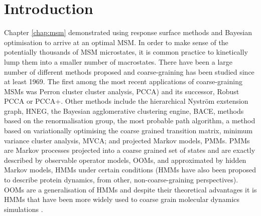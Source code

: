 \section{Introduction}
Chapter \ref{chap:msm} demonstrated using response surface methods and Bayesian optimisation to arrive at an optimal MSM. In order to make sense of the potentially thousands of MSM microstates, it is common practice to kinetically lump them into a smaller number of macrostates. There have been a large number of different methods proposed and coarse-graining has been studied since at least 1969\cite{kuoLumpingAnalysisMonomolecular, weiLumpingAnalysisMonomolecular1969}. The first among the most recent applications of coarse-graining MSMs was Perron cluster cluster analysis, PCCA\cite{deuflhardIdentificationAlmostInvariant2000a}) and its successor, Robust PCCA or PCCA+\cite{deuflhardRobustPerronCluster2005b}. Other methods include the hierarchical Nystr{\"o}m exstension graph, HNEG\cite{yaoHierarchicalNystromMethods2013a}, the Bayesian agglomerative clustering engine, BACE\cite{bowmanImprovedCoarsegrainingMarkov2012a}, methods based on the renormalisation group\cite{orioliDimensionalReductionMarkov2016c, hummerOptimalDimensionalityReduction2015a}, the most probable path algorithm\cite{jainIdentifyingMetastableStates2012a}, a method based on variationally optimising the coarse grained transition matrix\cite{martiniVariationalIdentificationMarkovian2017a}, minimum variance cluster analysis, MVCA\cite{husicMinimumVarianceClustering2018}; and projected Markov models, PMMs\cite{noeProjectedHiddenMarkov2013a}. PMMs are Markov processes projected into a coarse grained set of states and are exactly described by observable operator models, OOMs\cite{wuProjectedMetastableMarkov2015}, and approximated by hidden Markov models, HMMs\cite{noeProjectedHiddenMarkov2013a} under certain conditions (HMMs have also been proposed to describe protein dynamics, from other, non-coarse-graining perspectives\cite{mcgibbonUnderstandingProteinDynamics}). OOMs are a generalisation of HMMs\cite{jaegerDiscretetimeDiscretevaluedObservable} and despite their theoretical advantages it is HMMs that have been more widely used to coarse grain molecular dynamics simulations \cite{mondalAtomicResolutionMechanism2018a, plattnerCompleteProteinProtein2017, panConformationalHeterogeneityMichaelis2016, juarez-jimenezDynamicDesignManipulation2020, wangDynamicalBehaviorVLactamases2019,FastFoldingPathwaysThrombinBinding2018,remingtonFluorescenceQuenching2aminopurinelabeled2019,curado-carballadaHiddenConformationsAspergillus2019,furiniIontriggeredSelectivityBacterial2018,yangMappingPathwayDynamics2018,ahalawatMappingSubstrateRecognition2018,olaposiMembraneBoundTranscriptionFactor2019, xiaoNaBindingModes2019, hansonWhatMakesKinase2019}. 

